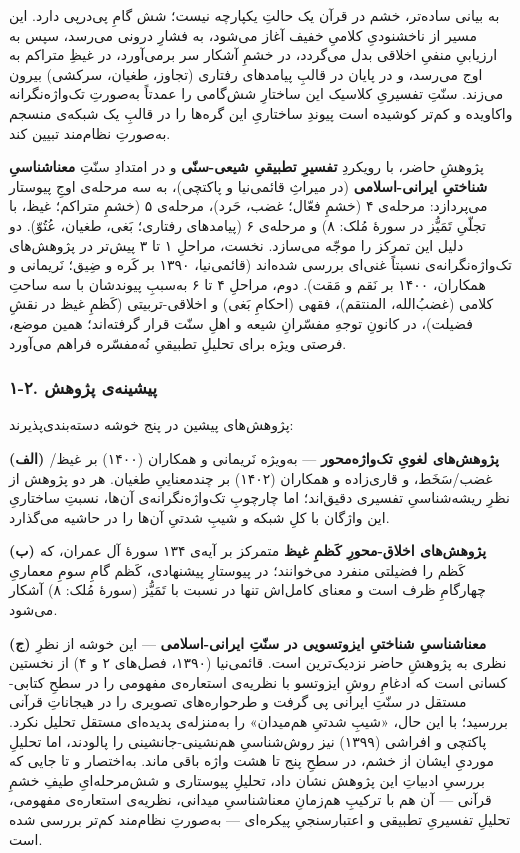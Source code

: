 \documentclass[12pt,a4paper]{article}
\begin{document}
\begin{RTL}
\begin{otherlanguage}{persian}
به بیانی ساده‌تر، خشم در قرآن یک حالتِ یکپارچه نیست؛ شش گامِ پی‌درپی دارد.
این مسیر از ناخشنودیِ کلامیِ خفیف آغاز می‌شود، به فشارِ درونی می‌رسد، سپس به
ارزیابیِ منفیِ اخلاقی بدل می‌گردد، در خشمِ آشکار سر برمی‌آورد، در غیظِ متراکم
به اوج می‌رسد، و در پایان در قالبِ پیامدهای رفتاری (تجاوز، طغیان، سرکشی)
بیرون می‌زند. سنّتِ تفسیریِ کلاسیک این ساختارِ شش‌گامی را عمدتاً به‌صورتِ
تک‌واژه‌نگرانه واکاویده و کم‌تر کوشیده است پیوندِ ساختاریِ این گره‌ها را در
قالبِ یک شبکه‌ی منسجم به‌صورتِ نظام‌مند تبیین کند.

پژوهشِ حاضر، با رویکردِ \textbf{تفسیرِ تطبیقیِ شیعی-سنّی} و در امتدادِ سنّتِ
\textbf{معناشناسیِ شناختیِ ایرانی-اسلامی} (در میراثِ قائمی‌نیا و پاکتچی)، به
سه مرحله‌ی اوجِ پیوستار می‌پردازد: مرحله‌ی ۴ (خشمِ فعّال؛ غضب، حَرد)، مرحله‌ی ۵
(خشمِ متراکم؛ غیظ، با تجلّیِ تَمَیُّز در سورۀ مُلک: ۸) و مرحله‌ی ۶ (پیامدهای
رفتاری؛ بَغی، طغیان، عُتُوّ). دو دلیل این تمرکز را موجّه می‌سازد. نخست، مراحلِ
۱ تا ۳ پیش‌تر در پژوهش‌های تک‌واژه‌نگرانه‌ی نسبتاً غنی‌ای بررسی شده‌اند
(قائمی‌نیا، ۱۳۹۰ بر کَره و ضِیق؛ نَریمانی و همکاران، ۱۴۰۰ بر نَقم و مَقت).
دوم، مراحلِ ۴ تا ۶ به‌سببِ پیوندشان با سه ساحتِ کلامی (غضبُ‌الله، المنتقم)،
فقهی (احکامِ بَغی) و اخلاقی-تربیتی (کَظمِ غیظ در نقشِ فضیلت)، در کانونِ توجهِ
مفسّرانِ شیعه و اهلِ سنّت قرار گرفته‌اند؛ همین موضع، فرصتی ویژه برای تحلیلِ
تطبیقیِ نُه‌مفسّره فراهم می‌آورد.

\subsubsection{۱-۲. پیشینه‌ی
پژوهش}\label{ux67eux6ccux634ux6ccux646ux647ux6cc-ux67eux698ux648ux647ux634}

پژوهش‌های پیشین در پنج خوشه دسته‌بندی‌پذیرند:

\textbf{(الف) پژوهش‌های لغویِ تک‌واژه‌محور} --- به‌ویژه نَریمانی و همکاران
(۱۴۰۰) بر غیظ/غضب/سَخَط، و قاری‌زاده و همکاران (۱۴۰۲) بر چندمعناییِ طغیان.
هر دو پژوهش از نظرِ ریشه‌شناسیِ تفسیری دقیق‌اند؛ اما چارچوبِ تک‌واژه‌نگرانه‌ی
آن‌ها، نسبتِ ساختاریِ این واژگان با کلِ شبکه و شیبِ شدتیِ آن‌ها را در حاشیه
می‌گذارد.

\textbf{(ب) پژوهش‌های اخلاق-محورِ کَظمِ غیظ} متمرکز بر آیه‌ی ۱۳۴ سورۀ آل
عمران، که کَظم را فضیلتی منفرد می‌خوانند؛ در پیوستارِ پیشنهادی، کَظم گامِ سومِ
معماریِ چهارگامِ ظرف است و معنای کامل‌اش تنها در نسبت با تَمَیُّز (سورۀ مُلک: ۸)
آشکار می‌شود.

\textbf{(ج) معناشناسیِ شناختیِ ایزوتسویی در سنّتِ ایرانی-اسلامی} --- این
خوشه از نظرِ نظری به پژوهشِ حاضر نزدیک‌ترین است. قائمی‌نیا (۱۳۹۰، فصل‌های ۲ و
۴) از نخستین کسانی است که ادغامِ روشِ ایزوتسو با نظریه‌ی استعاره‌ی مفهومی را
در سطحِ کتابی-مستقل در سنّتِ ایرانی پی گرفت و طرحواره‌های تصویری را در
هیجاناتِ قرآنی بررسید؛ با این حال، «شیبِ شدتیِ هم‌میدان» را به‌منزله‌ی پدیده‌ای
مستقل تحلیل نکرد. پاکتچی و افراشی (۱۳۹۹) نیز روش‌شناسیِ هم‌نشینی-جانشینی را
پالودند، اما تحلیلِ موردیِ ایشان از خشم، در سطحِ پنج تا هشت واژه باقی ماند.
به‌اختصار و تا جایی که بررسیِ ادبیاتِ این پژوهش نشان داد، تحلیلِ پیوستاری و
شش‌مرحله‌ایِ طیفِ خشمِ قرآنی --- آن هم با ترکیبِ هم‌زمانِ معناشناسیِ میدانی،
نظریه‌ی استعاره‌ی مفهومی، تحلیلِ تفسیریِ تطبیقی و اعتبارسنجیِ پیکره‌ای ---
به‌صورتِ نظام‌مند کم‌تر بررسی شده است.


\end{otherlanguage}
\end{RTL}
\end{document}
